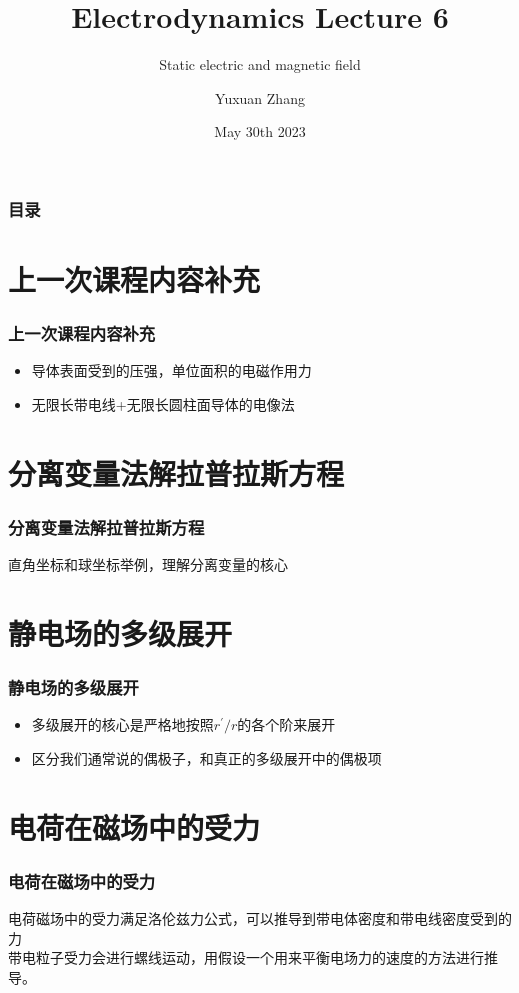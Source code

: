 \documentclass[10pt]{beamer}
\title[About Beamer] %
{Electrodynamics Lecture 6}
\subtitle{Static electric and magnetic field }
\author %
{Yuxuan Zhang }
\institute[VFU] %
{
  School of Physics \quad
  Zhejiang University
}
\date[VLC 2021] %
{May 30th 2023}
\begin{document}
\frame{\titlepage}

\begin{frame}
    \frametitle{目录}
    \tableofcontents
\end{frame}

\section{上一次课程内容补充}
\begin{frame}
    \frametitle{上一次课程内容补充}
    \begin{itemize}
        \item 导体表面受到的压强，单位面积的电磁作用力
        \item 无限长带电线+无限长圆柱面导体的电像法
    \end{itemize}
\end{frame}

\section{分离变量法解拉普拉斯方程}
\begin{frame}
    \frametitle{分离变量法解拉普拉斯方程}
    直角坐标和球坐标举例，理解分离变量的核心
\end{frame}

\section{静电场的多级展开}
\begin{frame}
    \frametitle{静电场的多级展开}
    \begin{itemize}

    \item 多级展开的核心是严格地按照$r^\prime/r$的各个阶来展开\\
    \item 区分我们通常说的偶极子，和真正的多级展开中的偶极项\\
    \end{itemize}
\end{frame}

\section{电荷在磁场中的受力}
\begin{frame}
    \frametitle{电荷在磁场中的受力}
    电荷磁场中的受力满足洛伦兹力公式，可以推导到带电体密度和带电线密度受到的力\\
    带电粒子受力会进行螺线运动，用假设一个用来平衡电场力的速度的方法进行推导。
\end{frame}
\end{document}
